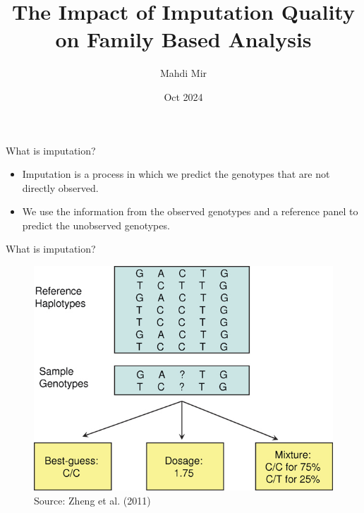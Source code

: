 \documentclass{beamer}
\title[]{The Impact of Imputation Quality on Family Based Analysis}
\author[]{Mahdi Mir}
\institute[]{SSGAC}
\date[]{Oct 2024}
\begin{document}
\maketitle

\begin{frame}{What is imputation?}
      \begin{itemize}
            \item Imputation is a process in which we predict the genotypes that are not directly observed.
            \item We use the information from the observed genotypes and a reference panel to predict the unobserved genotypes.
      \end{itemize}
\end{frame}

\begin{frame}{What is imputation?}
      \begin{figure}
            \centering
            \includegraphics[width= .7\textwidth]{fig/mfig001-2.jpg}
            \caption{Source: Zheng et al. (2011)}
      \end{figure}
\end{frame}
\end{document}
